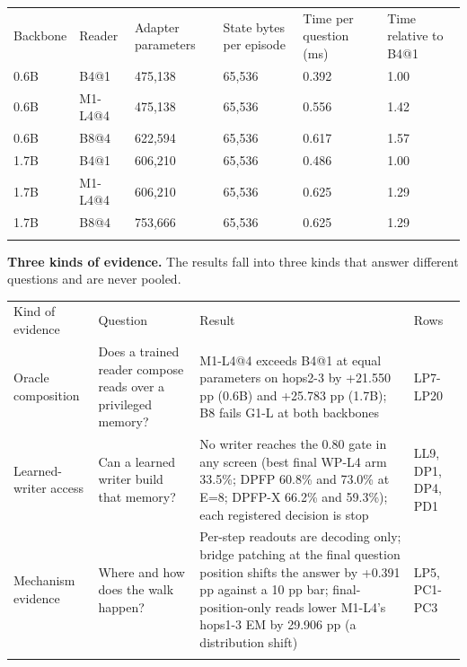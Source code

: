 {\footnotesize
\setlength{\tabcolsep}{3pt}
\begin{longtable}{W{167}{12}W{167}{12}W{167}{12}W{167}{12}W{167}{12}W{167}{12}}
\toprule
Backbone & Reader & Adapter parameters & State bytes per episode & Time per question (ms) & Time relative to B4@1 \\ \addlinespace[3pt]
\midrule \endhead
0.6B & B4@1 & 475,138 & 65,536 & 0.392 & 1.00 \\ \addlinespace[3pt]
0.6B & M1-L4@4 & 475,138 & 65,536 & 0.556 & 1.42 \\ \addlinespace[3pt]
0.6B & B8@4 & 622,594 & 65,536 & 0.617 & 1.57 \\ \addlinespace[3pt]
1.7B & B4@1 & 606,210 & 65,536 & 0.486 & 1.00 \\ \addlinespace[3pt]
1.7B & M1-L4@4 & 606,210 & 65,536 & 0.625 & 1.29 \\ \addlinespace[3pt]
1.7B & B8@4 & 753,666 & 65,536 & 0.625 & 1.29 \\ \addlinespace[3pt]
\bottomrule
\end{longtable}
}


\textbf{Three kinds of evidence.} The results fall into three kinds that answer different questions and are never pooled.


{\footnotesize
\setlength{\tabcolsep}{3pt}
\begin{longtable}{W{134}{8}W{263}{8}W{515}{8}W{88}{8}}
\toprule
Kind of evidence & Question & Result & Rows \\ \addlinespace[3pt]
\midrule \endhead
Oracle composition & Does a trained reader compose reads over a privileged memory? & M1-L4@4 exceeds B4@1 at equal parameters on hops2-3 by +21.550 pp (0.6B) and +25.783 pp (1.7B); B8 fails G1-L at both backbones & LP7-LP20 \\ \addlinespace[3pt]
Learned-writer access & Can a learned writer build that memory? & No writer reaches the 0.80 gate in any screen (best final WP-L4 arm 33.5\%; DPFP 60.8\% and 73.0\% at E=8; DPFP-X 66.2\% and 59.3\%); each registered decision is stop & LL9, DP1, DP4, PD1 \\ \addlinespace[3pt]
Mechanism evidence & Where and how does the walk happen? & Per-step readouts are decoding only; bridge patching at the final question position shifts the answer by +0.391 pp against a 10 pp bar; final-position-only reads lower M1-L4’s hops1-3 EM by 29.906 pp (a distribution shift) & LP5, PC1-PC3 \\ \addlinespace[3pt]
\bottomrule
\end{longtable}
}


